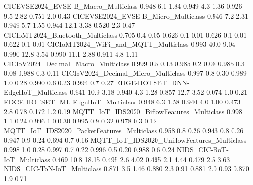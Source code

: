 CICEVSE2024_EVSE-B_Macro_Multiclass                                   0.948       6.1      1.84      0.949          4.3         1.36      0.926          9.5         2.82       0.751           2.0          0.43
CICEVSE2024_EVSE-B_Micro_Multiclass                                   0.946       7.2      2.31      0.949          5.7         1.55      0.944         12.1         3.38       0.520           2.3          0.47
CICIoMT2024_Bluetooth_Multiclass                                      0.705       0.4      0.05      0.626          0.1         0.01      0.626          0.1         0.01       0.622           0.1          0.01
CICIoMT2024_WiFi_and_MQTT_Multiclass                                  0.993      40.0      9.04      0.990         12.8         3.54      0.990         11.1         2.88       0.911           4.8          1.11
CICIoV2024_Decimal_Macro_Multiclass                                   0.999       0.5      0.13      0.985          0.2         0.08      0.985          0.3         0.08       0.988           0.3          0.11
CICIoV2024_Decimal_Micro_Multiclass                                   0.997       0.8      0.30      0.989          1.0         0.28      0.990          0.6         0.23       0.994           0.7          0.27
EDGE-IIOTSET_DNN-EdgeIIoT_Multiclass                                  0.941      10.9      3.18      0.940          4.3         1.28      0.857         12.7         3.52       0.074           1.0          0.21
EDGE-IIOTSET_ML-EdgeIIoT_Multiclass                                   0.948       6.3      1.58      0.940          4.0         1.00      0.473          2.8         0.78       0.172           1.2          0.19
MQTT_IoT_IDS2020_BiflowFeatures_Multiclass                            0.998       1.1      0.24      0.996          1.0         0.30      0.995          0.9         0.32       0.978           0.3          0.12
MQTT_IoT_IDS2020_PacketFeatures_Multiclass                            0.958       0.8      0.26      0.943          0.8         0.26      0.947          0.9         0.24       0.694           0.7          0.16
MQTT_IoT_IDS2020_UniflowFeatures_Multiclass                           0.998       1.0      0.28      0.997          0.7         0.22      0.996          0.5         0.20       0.988           0.6          0.24
NIDS_CIC-BoT-IoT_Multiclass                                           0.469      10.8     18.15      0.495          2.6         4.02      0.495          2.1         4.44       0.479           2.5          3.63
NIDS_CIC-ToN-IoT_Multiclass                                           0.871       3.5      1.46      0.880          2.3         0.91      0.881          2.0         0.93       0.870           1.9          0.71
